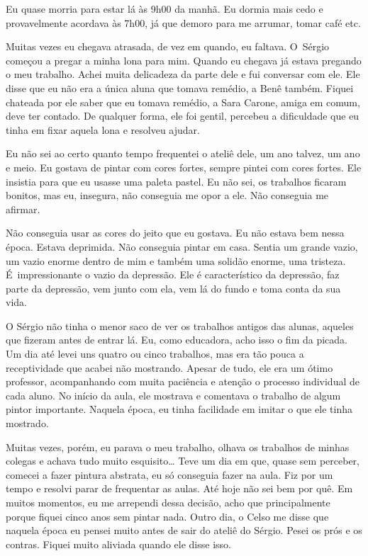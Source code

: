 Eu quase morria para estar lá às 9h00 da manhã. Eu dormia mais cedo e
provavelmente acordava às 7h00, já que demoro para me arrumar, tomar
café etc.

Muitas vezes eu chegava atrasada, de vez em quando, eu faltava. O~Sérgio
começou a pregar a minha lona para mim. Quando eu chegava já estava
pregando o meu trabalho. Achei muita delicadeza da parte dele e fui
conversar com ele. Ele disse que eu não era a única aluna que tomava
remédio, a Benê também. Fiquei chateada por ele saber que eu tomava
remédio, a Sara Carone, amiga em comum, deve ter contado. De qualquer
forma, ele foi gentil, percebeu a dificuldade que eu tinha em fixar
aquela lona e resolveu ajudar.

Eu não sei ao certo quanto tempo frequentei o ateliê dele, um ano
talvez, um ano e meio. Eu gostava de pintar com cores fortes, sempre
pintei com cores fortes. Ele insistia para que eu usasse uma paleta
pastel. Eu não sei, os trabalhos ficaram bonitos, mas eu, insegura, não
conseguia me opor a ele. Não conseguia me afirmar.

Não conseguia usar as cores do jeito que eu gostava. Eu não estava bem
nessa época. Estava deprimida. Não conseguia pintar em casa. Sentia um
grande vazio, um vazio enorme dentro de mim e também uma solidão enorme,
uma tristeza. É~impressionante o vazio da depressão. Ele é
característico da depressão, faz parte da depressão, vem junto com ela,
vem lá do fundo e toma conta da sua vida.

O Sérgio não tinha o menor saco de ver os trabalhos antigos das alunas,
aqueles que fizeram antes de entrar lá. Eu, como educadora, acho isso o
fim da picada. Um dia até levei uns quatro ou cinco trabalhos, mas era
tão pouca a receptividade que acabei não mostrando. Apesar de tudo, ele
era um ótimo professor, acompanhando com muita paciência e atenção o
processo individual de cada aluno. No início da aula, ele mostrava e
comentava o trabalho de algum pintor importante. Naquela época, eu tinha
facilidade em imitar o que ele tinha mostrado.

Muitas vezes, porém, eu parava o meu trabalho, olhava os trabalhos de
minhas colegas e achava tudo muito esquisito… Teve um dia em que,
quase sem perceber, comecei a fazer pintura abstrata, eu só conseguia
fazer na aula. Fiz por um tempo e resolvi parar de frequentar as aulas.
Até hoje não sei bem por quê. Em muitos momentos, eu me arrependi dessa
decisão, acho que principalmente porque fiquei cinco anos sem pintar
nada. Outro dia, o Celso me disse que naquela época eu pensei muito
antes de sair do ateliê do Sérgio. Pesei os prós e os contras. Fiquei
muito aliviada quando ele disse isso.

